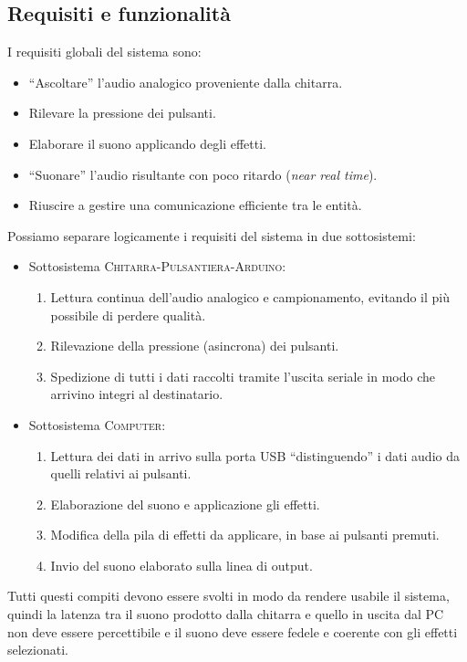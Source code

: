 \documentclass[a4paper,11pt]{article}
\begin{document}
\subsection{Requisiti e funzionalità}
I requisiti globali del sistema sono:
\begin{itemize}
    \item ``Ascoltare'' l'audio analogico proveniente dalla chitarra.
    \item Rilevare la pressione dei pulsanti.
    \item Elaborare il suono applicando degli effetti.
    \item ``Suonare'' l'audio risultante con poco ritardo (\textit{near real time}).
    \item Riuscire a gestire una comunicazione efficiente tra le entità.
\end{itemize}

Possiamo separare logicamente i requisiti del sistema in due sottosistemi:
\begin{itemize}
    \item Sottosistema \textsc{Chitarra-Pulsantiera-Arduino}:
    \begin{enumerate}
        \item Lettura continua dell'audio analogico e campionamento, evitando il più possibile di perdere qualità.
        \item Rilevazione della pressione (asincrona) dei pulsanti.
        \item Spedizione di tutti i dati raccolti tramite l'uscita seriale in modo che arrivino integri al destinatario.
    \end{enumerate}
    \item Sottosistema \textsc{Computer}:
    \begin{enumerate}
        \item Lettura dei dati in arrivo sulla porta USB ``distinguendo'' i dati audio da quelli relativi ai pulsanti.
        \item Elaborazione del suono e applicazione gli effetti.
        \item Modifica della pila di effetti da applicare, in base ai pulsanti premuti.
        \item Invio del suono elaborato sulla linea di output.
    \end{enumerate}
\end{itemize}

Tutti questi compiti devono essere svolti in modo da rendere usabile il sistema, quindi la latenza tra il suono prodotto dalla chitarra e quello in uscita dal PC non deve essere percettibile e il suono deve essere fedele e coerente con gli effetti selezionati.
\end{document}
